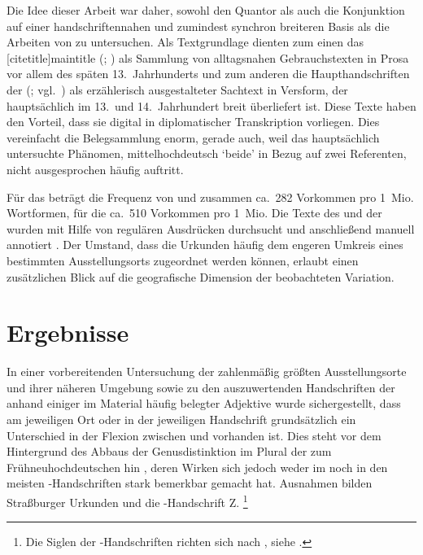 Die Idee dieser Arbeit war daher, sowohl den Quantor als auch die Konjunktion
 auf einer handschriftennahen und zumindest synchron breiteren
Basis als die Arbeiten von \citet{askedal1973,askedal1974} zu untersuchen. Als
Textgrundlage dienten zum einen das [citetitle]{maintitle}
(\CAO{}; \nosh\cites{cao1,cao2,cao3,cao4,caor,cao5}) als Sammlung von
alltagsnahen Gebrauchstexten in Prosa vor allem des späten 13.~Jahrhunderts und
zum anderen die Haupthandschriften der  (\KC{};
vgl.~\cites{schroeder1895,nellmann1983}) als erzählerisch ausgestalteter
Sachtext in Versform, der hauptsächlich im 13.\ und 14.\ Jahrhundert breit
über\-liefert ist. Diese Texte haben den Vorteil, dass sie digital in
diplomatischer Transkription vorliegen. Dies vereinfacht die Belegsammlung
enorm, gerade auch, weil das hauptsächlich untersuchte Phänomen,
mittelhochdeutsch  `beide' in Bezug auf zwei
Referenten, nicht ausgesprochen häufig auftritt.

Für das \CAO{} beträgt die Frequenz von  und 
zusammen ca.~282 Vorkommen pro 1~Mio. Wortformen, für die \KC{} ca.~510
Vorkommen pro 1~Mio. Die Texte des \CAO{} und der \KC{} wurden
mit Hilfe von regulären Ausdrücken durchsucht und anschließend manuell
annotiert \autocites[vgl.\ z.\,B.][33--37]{perkuhnetal2012}[zur Methode
vgl.][207--209]{beckerschallert2021}[155--158]{beckerschallert2022b}. Der
Umstand, dass die Urkunden häufig dem engeren Umkreis eines bestimmten
Ausstellungs\-orts zugeordnet werden können, erlaubt einen zusätzlichen Blick
auf die geografische Dimension der beobachteten Variation.

\section{Ergebnisse}

In einer vorbereitenden Untersuchung der zahlenmäßig größten Ausstellungs\-orte
und ihrer näheren Umgebung sowie zu den auszuwertenden Handschriften der
\KC{} anhand einiger im Material häufig belegter Adjektive wurde
sichergestellt, dass am jeweiligen Ort oder in der jeweiligen Handschrift
grundsätzlich ein Unterschied in der Flexion zwischen  und
 vorhanden ist. Dies steht vor dem Hintergrund des Abbaus der
Genusdistinktion im Plural der  zum
Frühneuhochdeutschen hin
\autocite[191--192]{reichmannwegera1993}, deren Wirken sich jedoch weder im
\CAO{} noch in den meisten \KC-Handschriften stark bemerkbar gemacht hat.
Ausnahmen bilden Straßburger Urkunden und die \KC{}-Handschrift Z.%
%
	\footnote{Die Siglen der \KC-Handschriften richten sich nach
		, siehe .}

